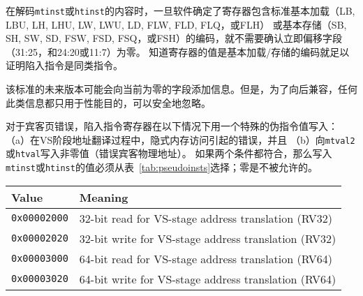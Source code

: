 \begin{commentary}
  在解码{\tt mtinst}或{\tt htinst}的内容时，一旦软件确定了寄存器包含标准基本加载（LB, LBU, LH, LHU, LW, LWU, LD, FLW, FLD, FLQ，或FLH）
  或基本存储（SB, SH, SW, SD, FSW, FSD, FSQ，或FSH）的编码，就不需要确认立即偏移字段（31:25，和24:20或11:7）为零。
  知道寄存器的值是基本加载/存储的编码就足以证明陷入指令是同类指令。

该标准的未来版本可能会向当前为零的字段添加信息。但是，为了向后兼容，任何此类信息都只用于性能目的，可以安全地忽略。
\end{commentary}

对于宾客页错误，陷入指令寄存器在以下情况下用一个特殊的伪指令值写入：
（a）在VS阶段地址翻译过程中，隐式内存访问引起的错误，并且
（b）向{\tt mtval2}或{\tt htval}写入非零值（错误宾客物理地址）。
如果两个条件都符合，那么写入{\tt mtinst}或{\tt htinst}的值必须从表~\ref{tab:pseudoinsts}选择；零是不被允许的。

\begin{table*}[h!]
\begin{center}
\begin{tabular}{|l|l|}
\hline
Value            & Meaning \\
\hline
{\tt 0x00002000} & 32-bit read for VS-stage address translation (RV32) \\
{\tt 0x00002020} & 32-bit write for VS-stage address translation (RV32) \\
\hline
{\tt 0x00003000} & 64-bit read for VS-stage address translation (RV64) \\
{\tt 0x00003020} & 64-bit write for VS-stage address translation (RV64) \\
\hline
\end{tabular}
\end{center}
\caption{Special pseudoinstruction values for guest-page faults.
The RV32 values are used when VSXLEN=32, and the RV64 values when VSXLEN=64.}
\label{tab:pseudoinsts}
\end{table*}

